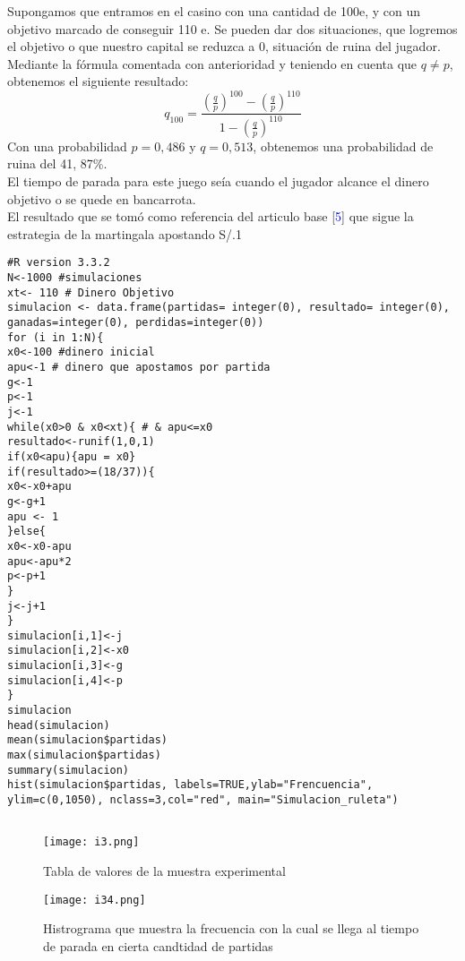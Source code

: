 \documentclass[letterpaper, 10 pt, conference]{ieeeconf}  %
\begin{document}
Supongamos que entramos en el casino con una cantidad de 100e, y con un objetivo
marcado de conseguir 110 e. Se pueden dar dos situaciones, que logremos el objetivo o
que nuestro capital se reduzca a 0, situación de ruina del jugador. Mediante la fórmula
comentada con anterioridad y teniendo en cuenta que $q\not=p$, obtenemos el siguiente
resultado:
\begin{equation}
    q_{100}=\dfrac{(\frac{q}{p})^{100}-(\frac{q}{p})^{110}}{1-(\frac{q}{p})^{110}}
\end{equation}
Con una probabilidad $p = 0,486$ y $q = 0,513$, obtenemos una probabilidad de ruina del
41, 87\%.\\
El tiempo de parada para este juego seía cuando el jugador alcance el dinero objetivo o se quede en bancarrota.\\
El resultado que se tomó como referencia del articulo base [\textcolor{blue}{5}] que sigue la estrategia de la martingala apostando S/.1 
\newpage
\begin{verbatim}
#R version 3.3.2 
N<-1000 #simulaciones
xt<- 110 # Dinero Objetivo
simulacion <- data.frame(partidas= integer(0), resultado= integer(0), ganadas=integer(0), perdidas=integer(0))
for (i in 1:N){
x0<-100 #dinero inicial
apu<-1 # dinero que apostamos por partida
g<-1
p<-1
j<-1
while(x0>0 & x0<xt){ # & apu<=x0
resultado<-runif(1,0,1)
if(x0<apu){apu = x0}
if(resultado>=(18/37)){
x0<-x0+apu
g<-g+1
apu <- 1
}else{
x0<-x0-apu
apu<-apu*2
p<-p+1
}
j<-j+1
}
simulacion[i,1]<-j
simulacion[i,2]<-x0
simulacion[i,3]<-g
simulacion[i,4]<-p
}
simulacion
head(simulacion)
mean(simulacion$partidas)
max(simulacion$partidas)
summary(simulacion)
hist(simulacion$partidas, labels=TRUE,ylab="Frencuencia", ylim=c(0,1050), nclass=3,col="red", main="Simulacion_ruleta")


\end{verbatim}
\begin{figure}
    \centering
    \texttt{[image: i3.png]}
    \caption{Tabla de valores de la muestra experimental}
    \label{fig:my_label}
\end{figure}
\begin{figure}
    \centering
    \texttt{[image: i34.png]}
    \caption{Histrograma que muestra la frecuencia con la cual se llega al tiempo de parada en cierta candtidad de partidas }
    \label{fig:my_label}
\end{figure}
\end{document}
